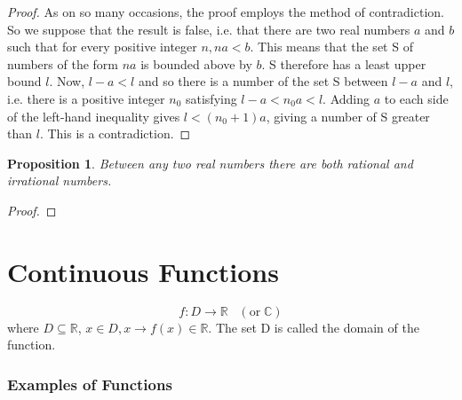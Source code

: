\documentclass[12pt]{scrbook}
\newtheorem{proposition}{Proposition}[section]
\begin{document}
\begin{proof}
As on so many occasions, the proof employs the method of contradiction.  So we suppose that the result is false, i.e. that there are two real numbers $a$ and $b$ such that for every positive integer $n, na < b$. This means that the set S of numbers of the form $na$ is bounded above by $b$.  S therefore has a least upper bound $l$.  Now, $l - a < l$ and so there is a number of the set S between $l - a$ and $l$, i.e. there is a positive integer $n_0$ satisfying $l - a < n_0 a < l$.  Adding $a$ to each side of the left-hand inequality gives $l < (n_0 + 1)a$, giving a number of S greater than $l$.  This is a contradiction.
\end{proof}

\begin{proposition}
Between any two real numbers there are both rational and irrational numbers.
\end{proposition}

\begin{proof}

\end{proof}


\chapter{Continuous Functions}

\[ f : D \rightarrow \mathbb{R} \;\;\; (\text{or} \; \mathbb{C}) \] 
where $D \subseteq \mathbb{R} $,  $x \in D, x \rightarrow f(x) \in \mathbb{R} $.
The set D is called the domain of the function.

\subsection{Examples of Functions}
\end{document}
